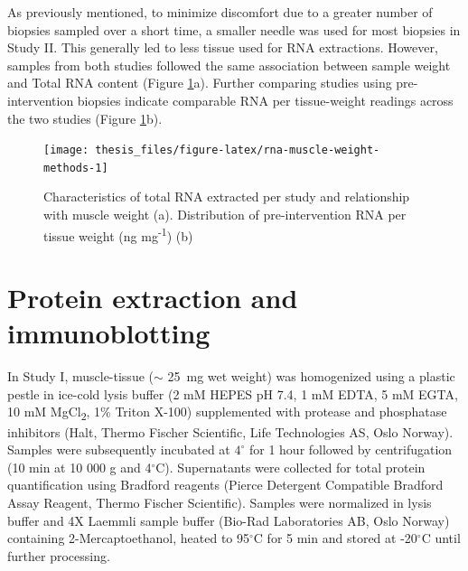\documentclass[twoside,10pt]{gihclass} %
\begin{document}
As previously mentioned, to minimize discomfort due to a greater number of biopsies sampled over a short time, a smaller needle was used for most biopsies in Study II. This generally led to less tissue used for RNA extractions. However, samples from both studies followed the same association between sample weight and Total RNA content (Figure \ref{fig:rna-muscle-weight-methods}a). Further comparing studies using pre-intervention biopsies indicate comparable RNA per tissue-weight readings across the two studies (Figure \ref{fig:rna-muscle-weight-methods}b).
\begin{figure}

{\centering \texttt{[image: thesis\_files/figure-latex/rna-muscle-weight-methods-1]} 

}

\caption[Characteristics of total RNA extracted per study]{Characteristics of total RNA extracted per study and relationship with muscle weight (a). Distribution of pre-intervention RNA per tissue weight (ng mg\textsuperscript{-1}) (b)}\label{fig:rna-muscle-weight-methods}
\end{figure}
\hypertarget{protein-extraction-and-immunoblotting}{%
\section{Protein extraction and immunoblotting}\label{protein-extraction-and-immunoblotting}}

In Study I, muscle-tissue (\(\sim\) \SI{25}{mg} wet weight) was homogenized using a plastic pestle in ice-cold lysis buffer (2 mM HEPES pH 7.4, 1 mM EDTA, 5 mM EGTA, 10 mM MgCl\textsubscript{2}, 1\(\%\) Triton X-100) supplemented with protease and phosphatase inhibitors (Halt, Thermo Fischer Scientific, Life Technologies AS, Oslo Norway). Samples were subsequently incubated at \(4^{\circ}\) for 1 hour followed by centrifugation (10 min at 10 000 g and 4\(^{\circ}\)C). Supernatants were collected for total protein quantification using Bradford reagents (Pierce Detergent Compatible Bradford Assay Reagent, Thermo Fischer Scientific).
Samples were normalized in lysis buffer and 4X Laemmli sample buffer (Bio-Rad Laboratories AB, Oslo Norway) containing 2-Mercaptoethanol, heated to 95\(^{\circ}\)C for 5 min and stored at -20\(^{\circ}\)C until further processing.
\end{document}
